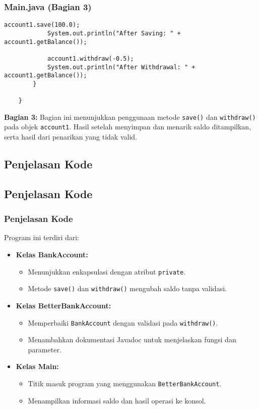 \documentclass[aspectratio=169, table]{beamer}
\begin{document}
	\begin{frame}[fragile]
		\frametitle{Main.java (Bagian 3)}
		\begin{lstlisting}[style=JavaStyle]
			account1.save(100.0);
			System.out.println("After Saving: " + account1.getBalance());
			
			account1.withdraw(-0.5);
			System.out.println("After Withdrawal: " + account1.getBalance());
		}
		
	}
\end{lstlisting}
\textbf{Bagian 3:} Bagian ini menunjukkan penggunaan metode \texttt{save()} dan \texttt{withdraw()} pada objek \texttt{account1}. Hasil setelah menyimpan dan menarik saldo ditampilkan, serta hasil dari penarikan yang tidak valid.
\end{frame}

\subsection{Penjelasan Kode}

\subsection{Penjelasan Kode}

\begin{frame}
\frametitle{Penjelasan Kode}
Program ini terdiri dari:
\begin{itemize}
	\item \textbf{Kelas BankAccount:}
	\begin{itemize}
		\item Menunjukkan enkapsulasi dengan atribut \texttt{private}.
		\item Metode \texttt{save()} dan \texttt{withdraw()} mengubah saldo tanpa validasi.
	\end{itemize}
	\item \textbf{Kelas BetterBankAccount:}
	\begin{itemize}
		\item Memperbaiki \texttt{BankAccount} dengan validasi pada \texttt{withdraw()}.
		\item Menambahkan dokumentasi Javadoc untuk menjelaskan fungsi dan parameter.
	\end{itemize}
	\item \textbf{Kelas Main:}
	\begin{itemize}
		\item Titik masuk program yang menggunakan \texttt{BetterBankAccount}.
		\item Menampilkan informasi saldo dan hasil operasi ke konsol.
	\end{itemize}
\end{itemize}
\end{frame}
\end{document}
